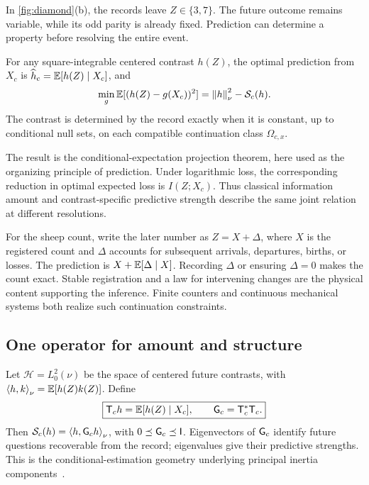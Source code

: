 In \cref{fig:diamond}(b), the records leave \(Z\in\{3,7\}\). The future outcome remains variable, while its odd parity is already fixed. Prediction can determine a property before resolving the entire event.

\begin{theorem}
\label{thm:prediction}
For any square-integrable centered contrast \(h(Z)\), the optimal prediction from \(X_c\) is \(\widehat h_c=\mathbb E[h(Z)\mid X_c]\), and
\begin{equation}
\min_g\mathbb E[(h(Z)-g(X_c))^2]
=\left\lVert h\right\rVert_\nu^2-\mathcal S_c(h).
\label{eq:prediction}
\end{equation}
The contrast is determined by the record exactly when it is constant, up to conditional null sets, on each compatible continuation class \(\Omega_{c,x}\).
\end{theorem}
The result is the conditional-expectation projection theorem, here used as the organizing principle of prediction. Under logarithmic loss, the corresponding reduction in optimal expected loss is \(I(Z;X_c)\). Thus classical information amount and contrast-specific predictive strength describe the same joint relation at different resolutions.

For the sheep count, write the later number as \(Z=X+\Delta\), where \(X\) is the registered count and \(\Delta\) accounts for subsequent arrivals, departures, births, or losses. The prediction is \(X+\mathbb E[\Delta\mid X]\). Recording \(\Delta\) or ensuring \(\Delta=0\) makes the count exact. Stable registration and a law for intervening changes are the physical content supporting the inference. Finite counters and continuous mechanical systems both realize such continuation constraints.

\subsection{One operator for amount and structure}
Let \(\mathcal H=L_0^2(\nu)\) be the space of centered future contrasts, with \(\left\langle h,k\right\rangle_\nu=\mathbb E[h(Z)k(Z)]\). Define
\begin{equation}
\boxed{\mathsf T_c h=\mathbb E[h(Z)\mid X_c],\qquad
\mathsf G_c=\mathsf T_c^*\mathsf T_c.}
\label{eq:operator}
\end{equation}
Then \(\mathcal S_c(h)=\left\langle h,\mathsf G_ch\right\rangle_\nu\), with \(0\preceq\mathsf G_c\preceq\mathsf I\). Eigenvectors of \(\mathsf G_c\) identify future questions recoverable from the record; eigenvalues give their predictive strengths. This is the conditional-estimation geometry underlying principal inertia components~\citep{calmon2017}.

